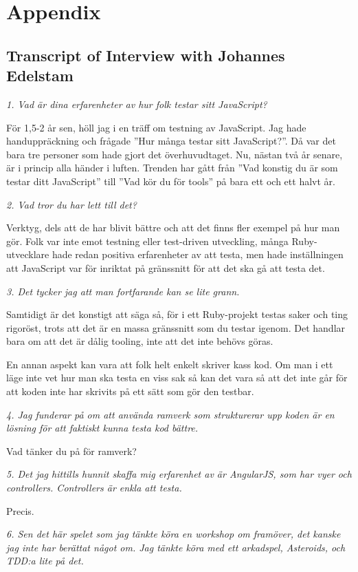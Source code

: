 \documentclass[11pt]{article}
\begin{document}
\section{Appendix}

\subsection{Transcript of Interview with Johannes Edelstam}

\emph{1. Vad är dina erfarenheter av hur folk testar sitt JavaScript?}

För 1,5-2 år sen, höll jag i en träff om testning av JavaScript. Jag hade handuppräckning och frågade ”Hur många testar sitt JavaScript?”. Då var det bara tre personer som hade gjort det överhuvudtaget. Nu, nästan två år senare, är i princip alla händer i luften. Trenden har gått från ”Vad konstig du är som testar ditt JavaScript” till ”Vad kör du för tools” på bara ett och ett halvt år.

\emph{2. Vad tror du har lett till det?}

Verktyg, dels att de har blivit bättre och att det finns fler exempel på hur man gör. Folk var inte emot testning eller test-driven utveckling, många Ruby-utvecklare hade redan positiva erfarenheter av att testa, men hade inställningen att JavaScript var för inriktat på gränssnitt för att det ska gå att testa det.

\emph{3. Det tycker jag att man fortfarande kan se lite grann.}

Samtidigt är det konstigt att säga så, för i ett Ruby-projekt testas saker och ting rigoröst, trots att det är en massa gränssnitt som du testar igenom. Det handlar bara om att det är dålig tooling, inte att det inte behövs göras.

En annan aspekt kan vara att folk helt enkelt skriver kass kod. Om man i ett läge inte vet hur man ska testa en viss sak så kan det vara så att det inte går för att koden inte har skrivits på ett sätt som gör den testbar.

\emph{4. Jag funderar på om att använda ramverk som strukturerar upp koden är en lösning för att faktiskt kunna testa kod bättre.}

Vad tänker du på för ramverk?

\emph{5. Det jag hittills hunnit skaffa mig erfarenhet av är AngularJS, som har vyer och controllers. Controllers är enkla att testa.}

Precis.

\emph{6. Sen det här spelet som jag tänkte köra en workshop om framöver, det kanske jag inte har berättat något om. Jag tänkte köra med ett arkadspel, Asteroids, och TDD:a lite på det.}
\end{document}

